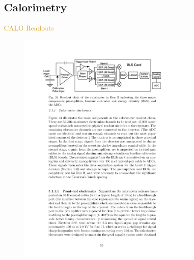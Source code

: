 \subsection*{Calorimetry}
\begin{frame}{\textcolor{Goldenrod}{CALO Readouts}}
  \begin{overlayarea}{\textwidth}{\textheight}
    \begin{figure}[h]
      \centering
      \includegraphics[width=0.8\textwidth]{./Images/110_extra_CALO_readouts}
    \end{figure}

  \end{overlayarea}
\end{frame}


